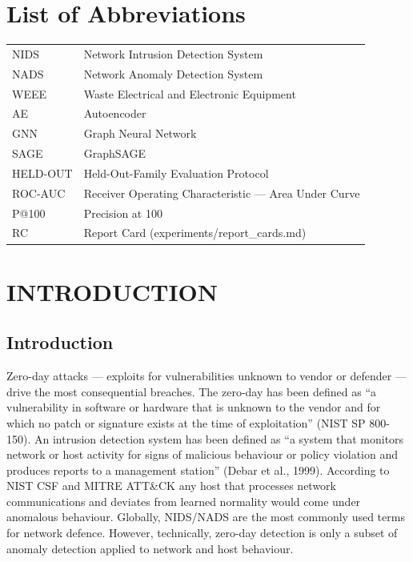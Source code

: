 \documentclass[12pt,a4paper,oneside]{report}
\begin{document}
\chapter*{List of Abbreviations}
\begin{tabular}{ll}
NIDS & Network Intrusion Detection System\\
NADS & Network Anomaly Detection System\\
WEEE & Waste Electrical and Electronic Equipment\\
AE & Autoencoder\\
GNN & Graph Neural Network\\
SAGE & GraphSAGE\\
HELD-OUT & Held-Out-Family Evaluation Protocol\\
ROC-AUC & Receiver Operating Characteristic — Area Under Curve\\
P@100 & Precision at 100\\
RC & Report Card (experiments/report\_cards.md)\\
\end{tabular}

\chapter{INTRODUCTION}
\label{ch:intro}

\section{Introduction}
Zero-day attacks — exploits for vulnerabilities unknown to vendor or defender — drive the most consequential breaches. The zero-day has been defined as ``a vulnerability in software or hardware that is unknown to the vendor and for which no patch or signature exists at the time of exploitation'' (NIST SP 800-150). An intrusion detection system has been defined as ``a system that monitors network or host activity for signs of malicious behaviour or policy violation and produces reports to a management station'' (Debar et al., 1999). According to NIST CSF and MITRE ATT\&CK any host that processes network communications and deviates from learned normality would come under anomalous behaviour. Globally, NIDS/NADS are the most commonly used terms for network defence. However, technically, zero-day detection is only a subset of anomaly detection applied to network and host behaviour.
\end{document}

